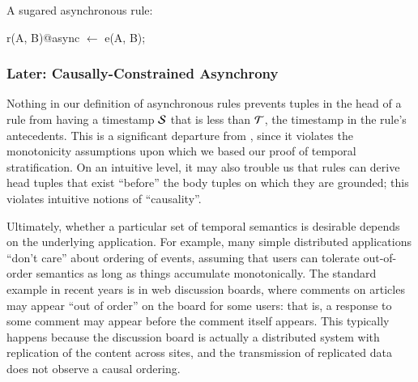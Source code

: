 \begin{example}
	A sugared asynchronous \lang rule:
	
\begin{Dedalus}
r(A, B)@async \(\leftarrow\) e(A, B);
\end{Dedalus}
\end{example}


\subsubsection{Later: Causally-Constrained Asynchrony}

Nothing in our definition of asynchronous rules prevents tuples in the head of a rule from having a timestamp $\SDedalus$ that is less than $\Tau$, the timestamp
in the rule's antecedents. This is a significant departure from \slang, since it
violates the monotonicity assumptions upon which we based our proof of temporal stratification.
On an intuitive level, it may also trouble us that rules can derive head tuples that exist ``before'' the body tuples on which they are grounded; this violates intuitive notions of ``causality''.


Ultimately, whether a particular set of temporal semantics is
desirable depends on the underlying application.  For example, many simple distributed applications ``don't care'' about ordering of events, assuming that users can tolerate out-of-order semantics as long as things accumulate monotonically.  The standard example in recent years is in web discussion boards, where comments on articles may appear ``out of order'' on the board for some users: that is, a response to some comment may appear before the comment itself appears.  This typically happens because the discussion board is actually a distributed system with replication of the content across sites, and the transmission of replicated data does not observe a causal ordering.

